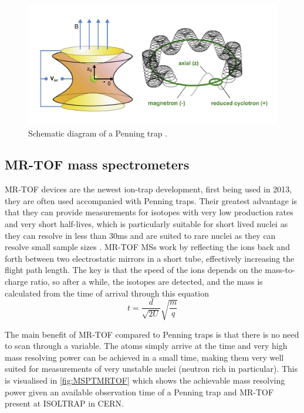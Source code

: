
\begin{figure}[H]
    \centering
    \includegraphics[width=.5\textwidth]{images/MS_penningtrap.png}
    \caption{Schematic diagram of a Penning trap \cite{famiano_nuclear_2019}.}\label{fig:MS_PT}
\end{figure}

\subsection{MR-TOF mass spectrometers}
MR-TOF devices are the newest ion-trap development, first being used in 2013, they are often used accompanied with Penning traps.
Their greatest advantage is that they can provide measurements for isotopes with very low production rates and very short half-lives, which is particularly suitable for short lived nuclei as they can resolve in less than 30ms and are suited to rare nuclei as they can resolve small sample sizes \cite{noauthor_isoltraps_nodate}.
MR-TOF MSs work by reflecting the ions back and forth between two electrostatic mirrors in a short tube, effectively increasing the flight path length.
The key is that the speed of the ions depends on the mass-to-charge ratio, so after a while, the isotopes are detected, and the mass is calculated from the time of arrival through this equation
\begin{equation}
    t = \frac{d}{\sqrt{2U}}\sqrt{\frac{m}{q}}
\end{equation}

The main benefit of MR-TOF compared to Penning traps is that there is no need to scan through a variable.
The atoms simply arrive at the time and very high mass resolving power can be achieved in a small time, making them very well suited for measurements of very unstable nuclei (neutron rich in particular).
This is visualised in \cref{fig:MSPTMRTOF} which shows the achievable mass resolving power given an available observation time of a Penning trap and MR-TOF present at ISOLTRAP in CERN.


